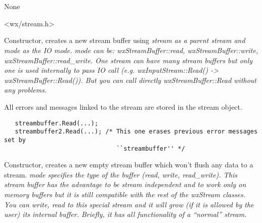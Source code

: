 \section{}\label{wxstreambuffer}


None


<wx/stream.h>




\label{wxstreambufconst}


Constructor, creates a new stream buffer using \it{stream} as a parent stream
and \it{mode} as the IO mode. \it{mode} can be: wxStreamBuffer::read,
wxStreamBuffer::write, wxStreamBuffer::read\_write.
One stream can have many stream buffers but only one is used internally to
pass IO call (e.g. wxInputStream::Read() -> wxStreamBuffer::Read()). But you
can call directly wxStreamBuffer::Read without any problems.


All errors and messages linked to the stream are stored in the stream object.
\begin{verbatim}
   streambuffer.Read(...);
   streambuffer2.Read(...); /* This one erases previous error messages set by 
                               ``streambuffer'' */
\end{verbatim}


Constructor, creates a new empty stream buffer which won't flush any data
to a stream. \it{mode} specifies the type of the buffer (read, write, read\_write). This stream buffer has the advantage to be stream independent and to
work only on memory buffers but it is still compatible with the rest of the
wxStream classes. You can write, read to this special stream and it will
grow (if it is allowed by the user) its internal buffer. Briefly, it has all
functionality of a ``normal'' stream.

